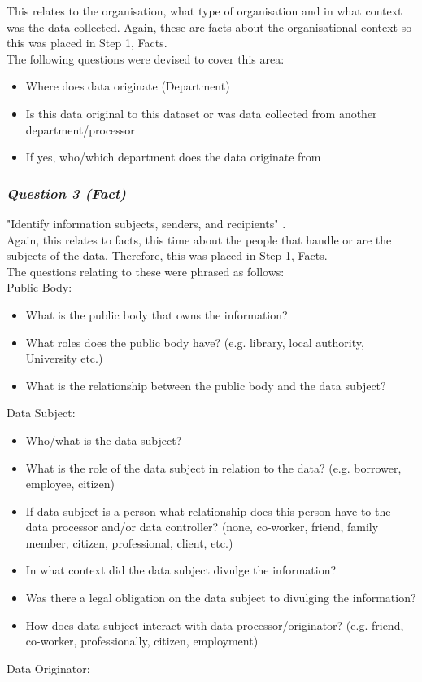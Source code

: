 This relates to the organisation, what type of organisation and in what context was the data collected. Again, these are facts about the organisational context so this was placed in Step 1, Facts.\\

The following questions were devised to cover this area:

\begin{itemize}

\item Where does data originate (Department)
\item Is this data original to this dataset or was data collected from another department/processor
\item If yes, who/which department does the data originate from
\end{itemize}

\subsubsection {{\it Question 3 {\bf(Fact)}}}
"Identify information subjects, senders, and recipients" \citep{Nissenbaum_2010}.\\

Again, this relates to facts, this time about the people that handle or are the subjects of the data. Therefore, this was placed in Step 1, Facts. \\

The questions relating to these were phrased as follows:\\

Public Body:
\begin{itemize}

\item What is the public body that owns the information?
\item What roles does the public body have? (e.g. library, local authority, University etc.)
\item What is the relationship between the public body and the data subject?\\
\end{itemize}

Data Subject:
\begin{itemize}
\item Who/what is the data subject?
\item What is the role of the data subject in relation to the data? (e.g. borrower, employee, citizen)
\item If data subject is a person what relationship does this person have to the data processor and/or data controller? (none, co-worker, friend, family member, citizen, professional, client, etc.)
\item In what context did the data subject divulge the information?
\item Was there a legal obligation on the data subject to divulging the information?
\item How does data subject interact with data processor/originator? (e.g. friend, co-worker, professionally, citizen, employment)\\
\end{itemize}
Data Originator:\\

